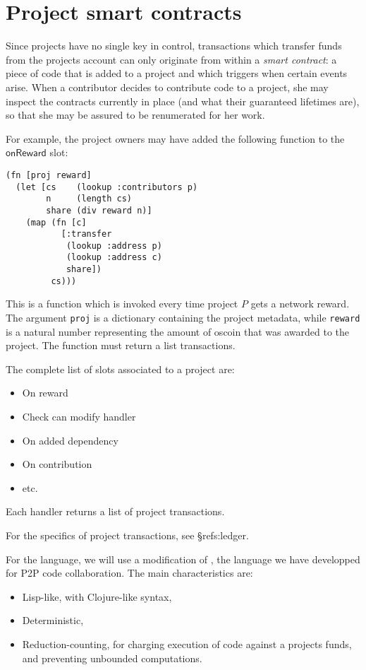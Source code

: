 \section{Project smart contracts}

Since projects have no single key in control, transactions which transfer funds
from the projects account can only originate from within a \emph{smart
  contract}: a piece of code that is added to a project and which triggers when
certain events arise. When a contributor decides to contribute code to a
project, she may inspect the contracts currently in place (and what their
guaranteed lifetimes are), so that she may be assured to be renumerated for her
work.

For example, the project owners may have added the following function to the
$\mathsf{onReward}$ slot:

\begin{lstlisting}
(fn [proj reward]
  (let [cs    (lookup :contributors p)
        n     (length cs)
        share (div reward n)]
    (map (fn [c]
           [:transfer
            (lookup :address p)
            (lookup :address c)
            share])
         cs)))
\end{lstlisting}

This is a function which is invoked every time project $P$ gets a network
reward. The argument \texttt{proj} is a dictionary containing the project
metadata, while \texttt{reward} is a natural number representing the amount of
oscoin that was awarded to the project. The function must return a list
transactions.

The complete list of slots associated to a project are:
\begin{itemize}
\item On reward
\item Check can modify handler
\item On added dependency
\item On contribution
\item etc. %
\end{itemize}

Each handler returns a list of project transactions.

For the specifics of project transactions, see \S ref{s:ledger}.

For the language, we will use a modification of \radicle{}, the language we have
developped for P2P code collaboration. The main characteristics are:
\begin{itemize}
\item Lisp-like, with Clojure-like syntax,
\item Deterministic,
\item Reduction-counting, for charging execution of code against a projects
  funds, and preventing unbounded computations.
\end{itemize}
